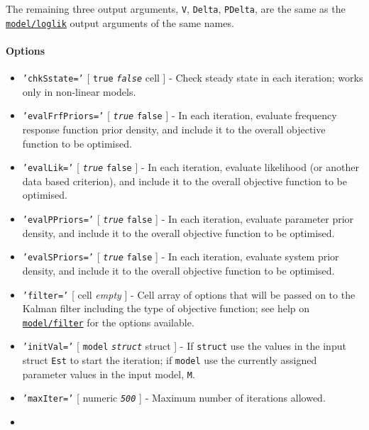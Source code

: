 The remaining three output arguments, \texttt{V}, \texttt{Delta},
\texttt{PDelta}, are the same as the
\href{model/loglik}{\texttt{model/loglik}} output arguments of the same
names.

\paragraph{Options}

\begin{itemize}
\item
  \texttt{'chkSstate='} {[} \texttt{true} \textbar{}
  \emph{\texttt{false}} \textbar{} cell {]} - Check steady state in each
  iteration; works only in non-linear models.
\item
  \texttt{'evalFrfPriors='} {[} \emph{\texttt{true}} \textbar{}
  \texttt{false} {]} - In each iteration, evaluate frequency response
  function prior density, and include it to the overall objective
  function to be optimised.
\item
  \texttt{'evalLik='} {[} \emph{\texttt{true}} \textbar{} \texttt{false}
  {]} - In each iteration, evaluate likelihood (or another data based
  criterion), and include it to the overall objective function to be
  optimised.
\item
  \texttt{'evalPPriors='} {[} \emph{\texttt{true}} \textbar{}
  \texttt{false} {]} - In each iteration, evaluate parameter prior
  density, and include it to the overall objective function to be
  optimised.
\item
  \texttt{'evalSPriors='} {[} \emph{\texttt{true}} \textbar{}
  \texttt{false} {]} - In each iteration, evaluate system prior density,
  and include it to the overall objective function to be optimised.
\item
  \texttt{'filter='} {[} cell \textbar{} \emph{empty} {]} - Cell array
  of options that will be passed on to the Kalman filter including the
  type of objective function; see help on
  \href{model/filter}{\texttt{model/filter}} for the options available.
\item
  \texttt{'initVal='} {[} \texttt{model} \textbar{}
  \emph{\texttt{struct}} \textbar{} struct {]} - If \texttt{struct} use
  the values in the input struct \texttt{Est} to start the iteration; if
  \texttt{model} use the currently assigned parameter values in the
  input model, \texttt{M}.
\item
  \texttt{'maxIter='} {[} numeric \textbar{} \emph{\texttt{500}} {]} -
  Maximum number of iterations allowed.
\item

\end{itemize}
